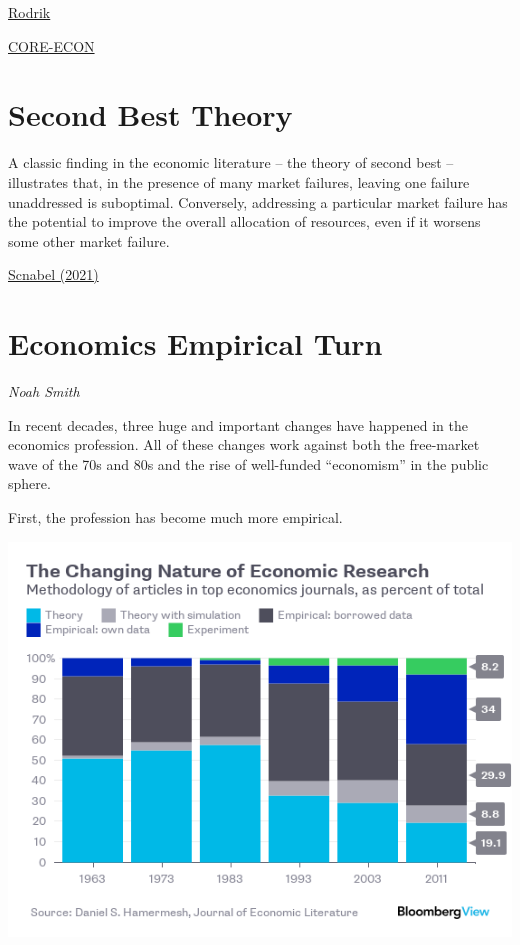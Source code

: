 \documentclass[
]{book}
\begin{document}
\href{https://www.project-syndicate.org/commentary/economic-policy-must-abandon-universal-paradigms-by-dani-rodrik-2021-05}{Rodrik}

\href{https://www.core-econ.org/}{CORE-ECON}

\hypertarget{second-best-theory}{%
\section{Second Best Theory}\label{second-best-theory}}

A classic finding in the economic literature -- the theory of second best -- illustrates that, in the presence of many market failures, leaving one failure unaddressed is suboptimal. Conversely, addressing a particular market failure has the potential to improve the overall allocation of resources, even if it worsens some other market failure.

\href{https://www.ecb.europa.eu/press/key/date/2021/html/ecb.sp210614~162bd7c253.en.html}{Scnabel (2021)}

\hypertarget{economics-empirical-turn}{%
\section{Economics Empirical Turn}\label{economics-empirical-turn}}

\emph{Noah Smith}

In recent decades, three huge and important changes have happened in the economics profession. All of these changes work against both the free-market wave of the 70s and 80s and the rise of well-funded ``economism'' in the public sphere.

First, the profession has become much more empirical.

\includegraphics{fig/economics_research_agenda.png}
\end{document}
